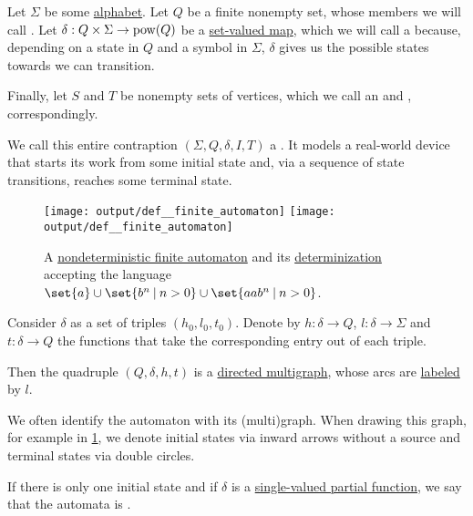 \begin{definition}\label{def:finite_automaton}
  Let \( \Sigma \) be some \hyperref[def:formal_language]{alphabet}. Let \( Q \) be a finite nonempty set, whose members we will call . Let \( \delta: Q \times \Sigma \to \operatorname{pow}(Q) \) be a \hyperref[def:function]{set-valued map}, which we will call a  because, depending on a state in \( Q \) and a symbol in \( \Sigma \), \( \delta \) gives us the possible states towards we can transition.

  Finally, let \( S \) and \( T \) be nonempty sets of vertices, which we call an  and , correspondingly.

  We call this entire contraption \( (\Sigma, Q, \delta, I, T) \) a . It models a real-world device that starts its work from some initial state and, via a sequence of state transitions, reaches some terminal state.

  \begin{figure}[!ht]
    \hfill
    \texttt{[image: output/def\_\_finite\_automaton]}
    \hfill
    \texttt{[image: output/def\_\_finite\_automaton]}
    \hfill\hfill
    \caption{A \hyperref[def:finite_automaton/determinism]{nondeterministic finite automaton} and its \hyperref[alg:determinization_of_finite_automata]{determinization} accepting the language \( \set{ a } \cup \set{ b^n \given n > 0 } \cup \set{ aa b^n \given n > 0 } \).}
    \label{fig:def:finite_automaton}
  \end{figure}

  \begin{thmenum}
     Consider \( \delta \) as a set of triples \( (h_0, l_0, t_0) \). Denote by \( h: \delta \to Q \), \( l: \delta \to \Sigma \) and \( t: \delta \to Q \) the functions that take the corresponding entry out of each triple.

    Then the quadruple \( (Q, \delta, h, t) \) is a \hyperref[def:directed_multigraph]{directed multigraph}, whose arcs are \hyperref[def:labeled_set]{labeled} by \( l \).

    We often identify the automaton with its (multi)graph. When drawing this graph, for example in \cref{fig:def:finite_automaton}, we denote initial states via inward arrows without a source and terminal states via double circles.

     If there is only one initial state and if \( \delta \) is a \hyperref[def:set_valued_map/partial]{single-valued partial function}, we say that the automata is .


\end{thmenum}
\end{definition}
